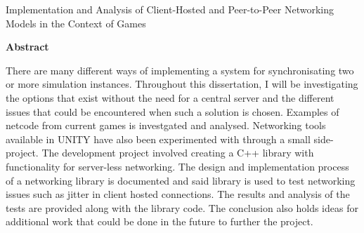 \thispagestyle{plain}
\begin{center}
  \makeatletter
  \Large
  \textbf{\@title}

  \vspace*{0.4cm}
  \large
  Implementation and Analysis of Client-Hosted and Peer-to-Peer Networking Models in the Context of Games

  \vspace*{0.4cm}
  \textbf{\@author}

  \vspace*{0.9cm}
  \textbf{Abstract}
  \makeatother
\end{center}
There are many different ways of implementing a system for synchronisating two or more simulation instances. Throughout this dissertation, I will be investigating the options that exist without the need for a central server and the different issues that could be encountered when such a solution is chosen. Examples of netcode from current games is investgated and analysed. Networking tools available in UNITY have also been experimented with through a small side-project.
The development project involved creating a C++ library with functionality for server-less networking. The design and implementation process of a networking library is documented and said library is used to test networking issues such as jitter in client hosted connections. The results and analysis of the tests are provided along with the library code. The conclusion also holds ideas for additional work that could be done in the future to further the project.
